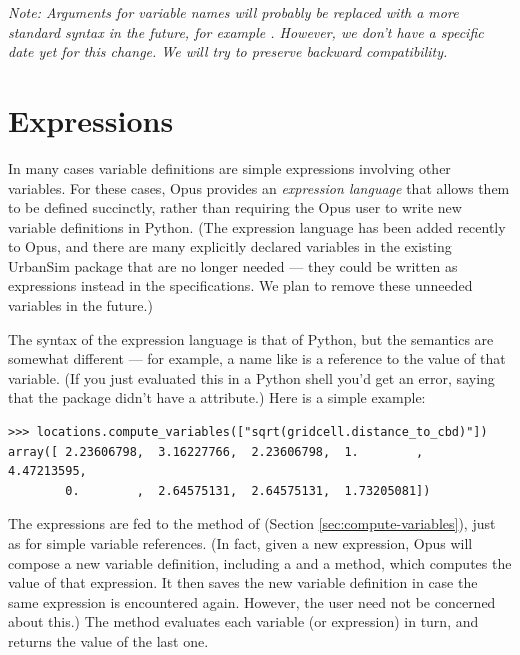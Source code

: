 \emph{Note: Arguments for variable names will probably be replaced with a
  more standard syntax in the future, for example
  .  However, we don't have
  a specific date yet for this change.  We will try to preserve backward
  compatibility.}

\section{Expressions}
\label{sec:urbansim-tutorial-expressions}

In many cases variable definitions are simple expressions involving other
variables.  For these cases, Opus provides an \emph{expression language}
that allows them to be defined succinctly, rather than requiring the Opus
user to write new variable definitions in Python.  (The expression language
has been added recently to Opus, and there are many explicitly declared
variables in the existing UrbanSim package that are no longer needed ---
they could be written as expressions instead in the specifications.  We
plan to remove these unneeded variables in the future.)

The syntax of the expression language is that of Python, but the semantics
are somewhat different --- for example, a name like
 is a reference to the value of that
variable.  (If you just evaluated this in a Python shell you'd get an
error, saying that the  package didn't have a
 attribute.)  Here is a simple example:

\begin{verbatim}
>>> locations.compute_variables(["sqrt(gridcell.distance_to_cbd)"])
array([ 2.23606798,  3.16227766,  2.23606798,  1.        ,  4.47213595,
        0.        ,  2.64575131,  2.64575131,  1.73205081])
\end{verbatim}

The expressions are fed to the  method 
 of
 (Section \ref{sec:compute-variables}), just as for simple
variable references.  (In fact, given a new expression, Opus will compose a
new variable definition, including a  and a
 method, which computes the value of that expression.
It then saves the new variable definition in case the same expression is
encountered again.  However, the user need not
be concerned about this.)  The  method evaluates
each variable (or expression) in turn, and returns the value of the last one.

